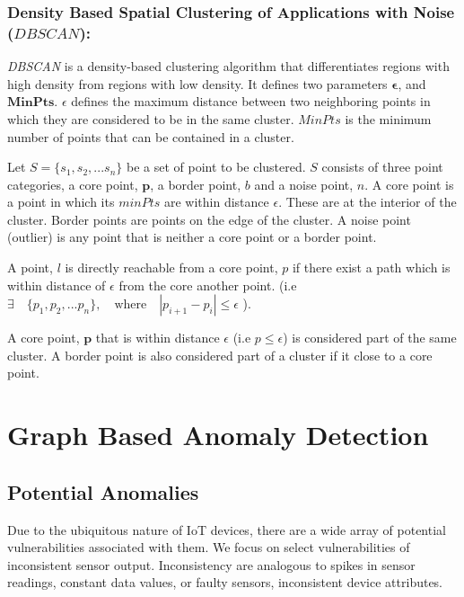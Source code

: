 \subsubsection{Density Based Spatial Clustering of Applications with Noise ($DBSCAN$):}

\textit{DBSCAN} is a density-based clustering algorithm that differentiates regions with high density from regions with low density. It defines two parameters $\boldsymbol{\epsilon}$, and $\boldsymbol{MinPts}$. $\epsilon$ defines the maximum distance between two neighboring points in which they are considered to be in the same cluster. $MinPts$ is the minimum number of points that can be contained in a cluster. 

Let $S = \{s_1, s_2,...s_n \}$ be a set of point to be clustered. $S$ consists of three point categories, a core point, $\boldsymbol{p}$, a border point, $b$ and a noise point, $n$. A core point is a point in which its $minPts$ are within distance $\epsilon$. These are at the interior of the cluster. Border points are points on the edge of the cluster. A noise point (outlier) is any point that is neither a core point or a border point.

A point, $l$ is directly reachable from a core point, $p$ if there exist a path which is within distance of $\epsilon$ from the core another point. (i.e $ \exists \quad  \{p_1, p_2,...p_n \},\quad \textrm{where} \quad |p_{i+1}  - p_i| \leq \epsilon$ ). 



A core point, $\boldsymbol{p}$ that is within distance $\epsilon$ (i.e $p \leq \epsilon$) is considered part of the same cluster. A border point is also considered part of a cluster if it close to a core point. 






\section{Graph Based Anomaly Detection }

\subsection{Potential Anomalies}

Due to the ubiquitous nature of IoT devices, there are a wide array of potential vulnerabilities associated with them. We focus on select vulnerabilities of inconsistent sensor output. Inconsistency are analogous to spikes in sensor readings, constant data values, or faulty sensors, inconsistent device attributes.





